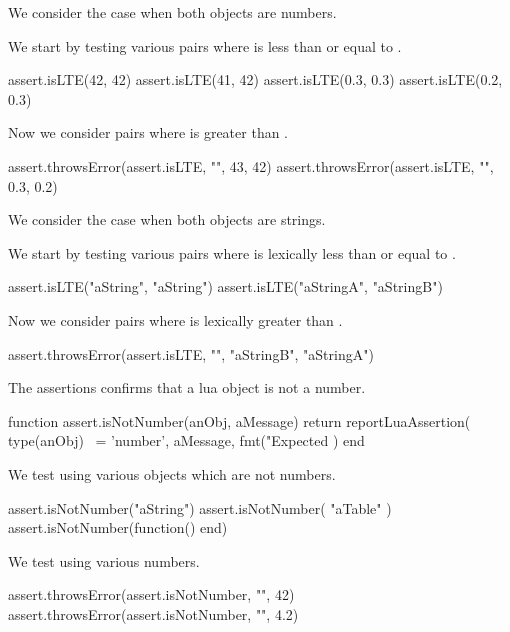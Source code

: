 
We consider the case when both objects are numbers. 

We start by testing various pairs where  is less than or equal 
to . 

\startLuaTest
  assert.isLTE(42, 42)
  assert.isLTE(41, 42)
  assert.isLTE(0.3, 0.3)
  assert.isLTE(0.2, 0.3)
\stopLuaTest

Now we consider pairs where  is greater than . 

\startLuaTest
  assert.throwsError(assert.isLTE, "", 43, 42)
  assert.throwsError(assert.isLTE, "", 0.3, 0.2)
\stopLuaTest
\stopTestCase


We consider the case when both objects are strings.

We start by testing various pairs where  is lexically less than 
or equal to . 

\startLuaTest
  assert.isLTE("aString", "aString")
  assert.isLTE("aStringA", "aStringB")
\stopLuaTest

Now we consider pairs where  is lexically greater than 
. 

\startLuaTest
  assert.throwsError(assert.isLTE, "", "aStringB", "aStringA")
\stopLuaTest

\stopTestCase

\stopTestSuite


The  assertions confirms that a lua object is not 
a number. 

\startLuaCode
function assert.isNotNumber(anObj, aMessage)
  return reportLuaAssertion(
    type(anObj) ~= 'number',
    aMessage,
    fmt("Expected %
  )
end
\stopLuaCode


We test using various objects which are not numbers. 

\startLuaTest
  assert.isNotNumber("aString")
  assert.isNotNumber({ "aTable" })
  assert.isNotNumber(function() end)
\stopLuaTest
\stopTestCase


We test using various numbers.

\startLuaTest
  assert.throwsError(assert.isNotNumber, "", 42)
  assert.throwsError(assert.isNotNumber, "", 4.2)
\stopLuaTest
\stopTestCase

